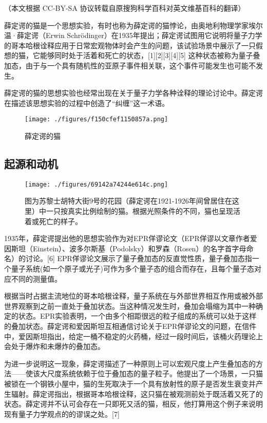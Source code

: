
（本文根据 CC-BY-SA 协议转载自原搜狗科学百科对英文维基百科的翻译）

薛定谔的猫是一个思想实验，有时也称为薛定谔的猫悖论，由奥地利物理学家埃尔温·薛定谔（Erwin Schrödinger）在1935年提出；薛定谔试图用它说明将量子力学的哥本哈根诠释应用于日常宏观物体时会产生的问题，该试验场景中展示了一只假想的猫，它能够同时处于活着和死亡的状态，[1][2][3][4][5] 这种状态被称为量子叠加态，由于与一个具有随机性的亚原子事件相关联，这个事件可能发生也可能不发生。

薛定谔的猫的思想实验也经常出现在关于量子力学各种诠释的理论讨论中。薛定谔在描述该思想实验的过程中创造了“纠缠”这一术语。
\begin{figure}[ht]
\centering
\texttt{[image: ./figures/f150cfef1150857a.png]}
\caption{薛定谔的猫} \label{fig_XDEDM_1}
\end{figure}

\subsection{起源和动机}
\begin{figure}[ht]
\centering
\texttt{[image: ./figures/69142a74244e614c.png]}
\caption{图为苏黎士胡特大街9号的花园（薛定谔在1921-1926年间曾居住在这里）中一只按真实比例绘制的猫。根据光照条件的不同，猫也呈现活着或死亡的样子。} \label{fig_XDEDM_2}
\end{figure}
1935年，薛定谔提出他的思想实验作为对EPR佯谬论文（EPR佯谬以文章作者爱因斯坦（Einstein）、波多尔斯基（Podolsky）和罗森（Rosen）的名字首字母命名）的讨论。[6] EPR佯谬论文展示了量子叠加态的反直觉性质，量子叠加态指一个量子系统(如一个原子或光子)可作为多个量子态的组合而存在，且每个量子态对应不同的测量值。

根据当时占据主流地位的哥本哈根诠释，量子系统在与外部世界相互作用或被外部世界观察到之前一直处于叠加状态。当这种情况发生时，叠加会塌缩为其中一种确定的状态。EPR实验表明，一个由多个相距很远的粒子组成的系统可以处于这样的叠加状态。薛定谔和爱因斯坦互相通信讨论关于EPR佯谬论文的问题，在信件中，爱因斯坦指出，给定一桶不稳定的火药桶，经过一段时间后，该桶火药理论上会处于爆炸和未爆炸的叠加态。

为进一步说明这一现象，薛定谔描述了一种原则上可以宏观尺度上产生叠加态的方法——使该大尺度系统依赖于位于叠加态的量子粒子。他提出了一个场景，一只猫被锁在一个钢铁小屋中，猫的生死取决于一个具有放射性的原子是否发生衰变并产生辐射。薛定谔指出，根据哥本哈根诠释，这只猫在被观测前处于既活着又死了的状态。薛定谔并不认可会存在一只即死又活的猫，相反，他打算用这个例子来说明现有量子力学观点的的谬误之处。[7]

